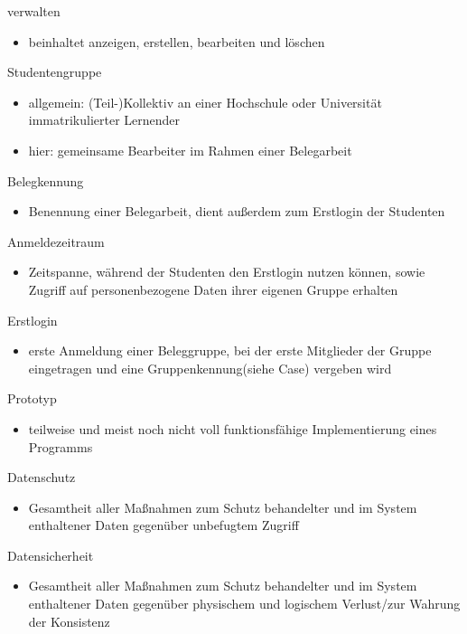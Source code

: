 \documentclass{article}
\begin{document}
verwalten
\begin{itemize} 
\item beinhaltet anzeigen, erstellen, bearbeiten und löschen
\end{itemize}

Studentengruppe 
\begin{itemize} 
\item allgemein: (Teil-)Kollektiv an einer Hochschule oder Universität immatrikulierter Lernender
\item hier: gemeinsame Bearbeiter im Rahmen einer Belegarbeit 
\end{itemize}

Belegkennung
\begin{itemize} 
\item Benennung einer Belegarbeit, dient außerdem zum Erstlogin der Studenten
\end{itemize}

Anmeldezeitraum
\begin{itemize} 
\item Zeitspanne, während der Studenten den Erstlogin nutzen können, sowie Zugriff auf personenbezogene Daten ihrer eigenen Gruppe erhalten
\end{itemize}

Erstlogin
\begin{itemize} 
\item erste Anmeldung einer Beleggruppe, bei der erste Mitglieder der Gruppe eingetragen und eine Gruppenkennung(siehe Case) vergeben wird
\end{itemize}
Prototyp
\begin{itemize} 
\item teilweise und meist noch nicht voll funktionsfähige Implementierung eines Programms
\end{itemize}

Datenschutz
\begin{itemize} 
\item Gesamtheit aller Maßnahmen zum Schutz behandelter und im System enthaltener Daten gegenüber unbefugtem Zugriff
\end{itemize}

Datensicherheit
\begin{itemize} 
\item Gesamtheit aller Maßnahmen zum Schutz behandelter und im System enthaltener Daten gegenüber physischem und logischem Verlust/zur Wahrung der Konsistenz
\end{itemize}
\end{document}
